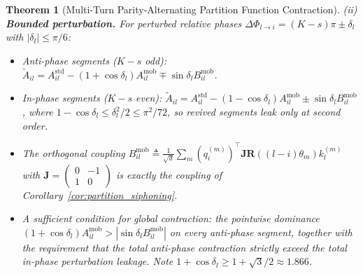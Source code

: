 \documentclass[11pt,a4paper]{article}
\newtheorem{theorem}{Theorem}
\theoremstyle{definition}
\begin{document}
\begin{theorem}[Multi-Turn Parity-Alternating Partition Function Contraction]
(ii) \textbf{Bounded perturbation.} For perturbed relative phases $\Delta\Phi_{l \to i} = (K - s)\pi \pm \delta_l$ with $|\delta_l| \le \pi/6$:
\begin{itemize}
    \item Anti-phase segments ($K - s$ odd): $\tilde{A}_{il} = A_{il}^{\text{std}} - (1 + \cos\delta_l)A_{il}^{\text{mob}} \mp \sin\delta_l B_{il}^{\text{mob}}$.
    \item In-phase segments ($K - s$ even): $\tilde{A}_{il} = A_{il}^{\text{std}} - (1 - \cos\delta_l)A_{il}^{\text{mob}} \pm \sin\delta_l B_{il}^{\text{mob}}$, where $1 - \cos\delta_l \le \delta_l^2/2 \le \pi^2/72$, so revived segments leak only at second order.
    \item The orthogonal coupling $B_{il}^{\text{mob}} \triangleq \frac{1}{\sqrt{d}}\sum_m (q_i^{(m)})^\top \mathbf{J} \mathbf{R}((l-i)\theta_m) k_l^{(m)}$ with $\mathbf{J} = \begin{pmatrix} 0 & -1 \\ 1 & 0 \end{pmatrix}$ is exactly the coupling of Corollary~\ref{cor:partition_siphoning}.
    \item A sufficient condition for global contraction: the pointwise dominance $(1 + \cos\delta_l)A_{il}^{\text{mob}} > |\sin\delta_l B_{il}^{\text{mob}}|$ on every anti-phase segment, together with the requirement that the total anti-phase contraction strictly exceed the total in-phase perturbation leakage. Note $1 + \cos\delta_l \ge 1 + \sqrt{3}/2 \approx 1.866$.
\end{itemize}
\end{theorem}
\end{document}
